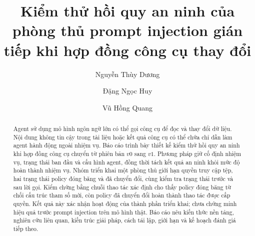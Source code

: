 \documentclass[runningheads,a4paper]{llncs}
\begin{document}
\title{Kiểm thử hồi quy an ninh của phòng thủ prompt injection gián tiếp khi hợp đồng công cụ thay đổi}
\author{Nguyễn Thùy Dương \and Đặng Ngọc Huy \and Vũ Hồng Quang}
\maketitle
\begin{abstract}
Agent sử dụng mô hình ngôn ngữ lớn có thể gọi công cụ để đọc và thay đổi dữ liệu. Nội dung không tin cậy trong tài liệu hoặc kết quả công cụ có thể chứa chỉ dẫn làm agent hành động ngoài nhiệm vụ. Báo cáo trình bày thiết kế kiểm thử hồi quy an ninh khi hợp đồng công cụ chuyển từ phiên bản $v0$ sang $v1$. Phương pháp giữ cố định nhiệm vụ, trạng thái ban đầu và cấu hình agent, đồng thời tách kết quả an ninh khỏi mức độ hoàn thành nhiệm vụ. Nhóm triển khai một phòng thủ giới hạn quyền truy cập tệp, hai trạng thái policy đóng băng và đã chuyển đổi, cùng kiểm tra trạng thái trước và sau lời gọi. Kiểm chứng bằng chuỗi thao tác xác định cho thấy policy đóng băng từ chối cấu trúc tham số mới, còn policy đã chuyển đổi hoàn thành thao tác được cấp quyền. Kết quả này xác nhận hoạt động của thành phần triển khai; chưa chứng minh hiệu quả trước prompt injection trên mô hình thật. Báo cáo nêu kiến thức nền tảng, nghiên cứu liên quan, kiến trúc giải pháp, cách tái lập, giới hạn và kế hoạch đánh giá tiếp theo.
\end{abstract}






\clearpage
\renewcommand{\refname}{Tài liệu tham khảo}


\end{document}
